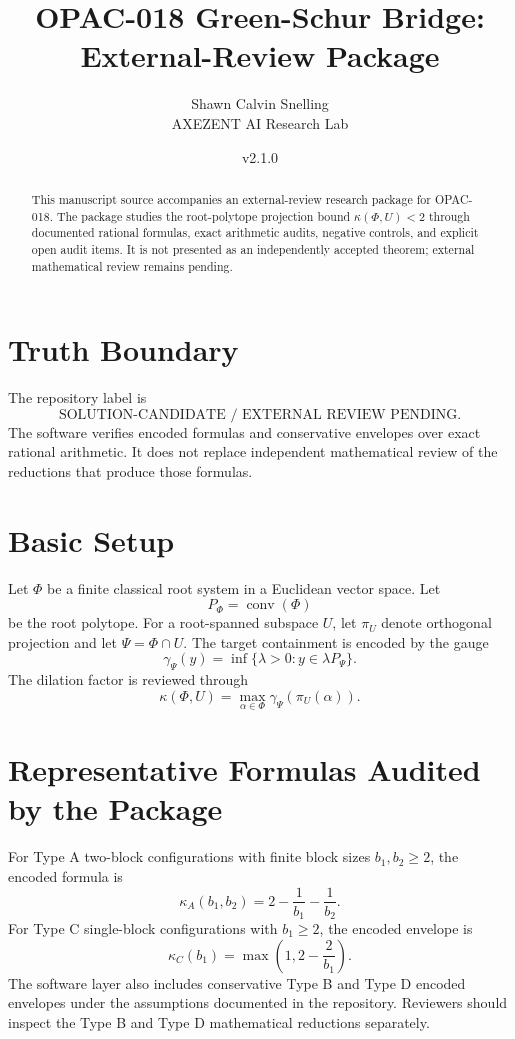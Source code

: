 \documentclass[11pt]{article}
\title{OPAC-018 Green-Schur Bridge: External-Review Package}
\author{Shawn Calvin Snelling\\AXEZENT AI Research Lab}
\date{v2.1.0}
\begin{document}
\maketitle

\begin{abstract}
This manuscript source accompanies an external-review research package for OPAC-018. The package studies the root-polytope projection bound $\kappa(\Phi,U)<2$ through documented rational formulas, exact arithmetic audits, negative controls, and explicit open audit items. It is not presented as an independently accepted theorem; external mathematical review remains pending.
\end{abstract}

\section{Truth Boundary}
The repository label is
\[
\text{SOLUTION-CANDIDATE / EXTERNAL REVIEW PENDING}.
\]
The software verifies encoded formulas and conservative envelopes over exact rational arithmetic. It does not replace independent mathematical review of the reductions that produce those formulas.

\section{Basic Setup}
Let $\Phi$ be a finite classical root system in a Euclidean vector space. Let
\[
P_\Phi = \operatorname{conv}(\Phi)
\]
be the root polytope. For a root-spanned subspace $U$, let $\pi_U$ denote orthogonal projection and let $\Psi=\Phi \cap U$. The target containment is encoded by the gauge
\[
\gamma_\Psi(y)=\inf\{\lambda>0:y\in \lambda P_\Psi\}.
\]
The dilation factor is reviewed through
\[
\kappa(\Phi,U)=\max_{\alpha\in\Phi}\gamma_\Psi(\pi_U(\alpha)).
\]

\section{Representative Formulas Audited by the Package}
For Type A two-block configurations with finite block sizes $b_1,b_2\geq 2$, the encoded formula is
\[
\kappa_A(b_1,b_2)=2-\frac{1}{b_1}-\frac{1}{b_2}.
\]
For Type C single-block configurations with $b_1\geq 2$, the encoded envelope is
\[
\kappa_C(b_1)=\max\left(1,2-\frac{2}{b_1}\right).
\]
The software layer also includes conservative Type B and Type D encoded envelopes under the assumptions documented in the repository. Reviewers should inspect the Type B and Type D mathematical reductions separately.
\end{document}
